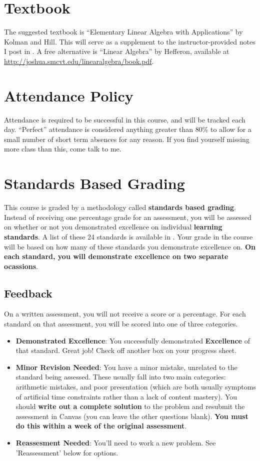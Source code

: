\documentclass{article}
\begin{document}
\section*{\fontsize{12}{15}\selectfont Textbook}
The suggested textbook is ``Elementary Linear Algebra with Applications'' by Kolman and Hill.  This will serve as a supplement to the instructor-provided notes I post in \LMS.  A free alternative is ``Linear Algebra'' by Hefferon, available at \url{http://joshua.smcvt.edu/linearalgebra/book.pdf}.


\section*{\fontsize{12}{15}\selectfont Attendance Policy}
Attendance is required to be successful in this course, and will be tracked each day.
``Perfect'' attendance is considered anything greater than 80\%
to allow for a small number of short term absences for any reason.
If you find yourself missing more class than this, come talk to me.


\section*{\fontsize{12}{15}\selectfont Standards Based Grading}
This course is graded by a methodology called {\bf standards based grading}.  Instead of receiving one percentage grade for an assessment, you will be assessed on whether or not you demonstrated excellence on individual {\bf learning standards}.  A list of these 24 standards is available in \LMS.  Your grade in the course will be based on how many of these standards you demonstrate excellence on.  {\bf On each standard, you will demonstrate excellence on two separate ocassions}.



    \subsection*{\fontsize{10}{12}\selectfont Feedback}
    On a written assessment, you will not receive a score or a percentage.  For each standard on that assessment, you will be scored into one of three categories.
\begin{itemize}
    \item \textbf{Demonstrated Excellence}: You successfully demonstrated {\bf Excellence} of that standard.  Great job!  Check off another box on your progress sheet.
    \item \textbf{Minor Revision Needed}: You have a minor mistake, unrelated to the standard being assessed.  These usually fall into two main categories: arithmetic mistakes, and poor presentation (which are both usually symptoms of artificial time constraints rather than a lack of content mastery).  You should {\bf write out a complete solution} to the problem and resubmit the assessment in Canvas (you can leave the other questions blank). \textbf{You must do this within a week of the original assessment}.    
    \item \textbf{Reassesment Needed}: You'll need to work a new problem. See 'Reassessment' below for options.
    \end{itemize}
\end{document}
